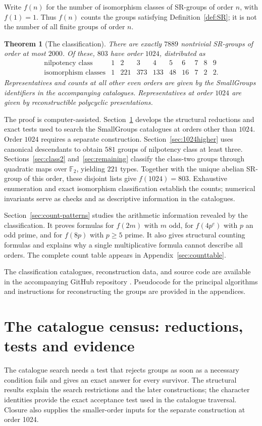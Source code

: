\documentclass[11pt,a4paper]{amsart}
\newtheorem{thm}{Theorem}[section]
\theoremstyle{definition}
\theoremstyle{remark}
\numberwithin{equation}{section}
\begin{document}
Write $f(n)$ for the number of isomorphism classes of SR-groups of
order $n$, with $f(1)=1$. Thus $f(n)$ counts the groups satisfying
Definition~\ref{def:SR}; it is not the number of all finite groups
of order $n$.
\begin{thm}[The classification]\label{thm:main-classification}
There are exactly $7889$ nontrivial SR-groups of order at most $2000$.
Of these, $803$ have order $1024$, distributed as
\[
\begin{array}{c|rrrrrrrrr}
\text{nilpotency class}&1&2&3&4&5&6&7&8&9\\\hline
\text{isomorphism classes}&1&221&373&133&48&16&7&2&2.
\end{array}
\]
Representatives and counts at all other even orders are given by the
SmallGroups identifiers in the accompanying catalogues. Representatives
at order $1024$ are given by reconstructible polycyclic presentations.
\end{thm}
The proof is computer-assisted. Section~\ref{sec:census} develops the
structural reductions and exact tests used to search the SmallGroups
catalogues at orders other than $1024$. Order $1024$ requires a separate
construction. Section~\ref{sec:1024higher} uses canonical descendants
to obtain $581$ groups of nilpotency class at least three.
Sections~\ref{sec:class2} and~\ref{sec:remaining} classify the class-two
groups through quadratic maps over $\mathbb F_2$, yielding $221$ types.
Together with the unique abelian SR-group of this order, these disjoint
lists give $f(1024)=803$. Exhaustive enumeration and exact isomorphism
classification establish the counts; numerical invariants serve as
checks and as descriptive information in the catalogues.

Section~\ref{sec:count-patterns} studies the arithmetic information
revealed by the classification. It proves formulas for $f(2m)$ with
$m$ odd, for $f(4p^e)$ with $p$ an odd prime, and for $f(8p)$ with
$p\ge5$ prime. It also gives structural counting formulas and explains
why a single multiplicative formula cannot describe all orders.
The complete count table appears in Appendix~\ref{sec:counttable}.

The classification catalogues, reconstruction data, and source code
are available in the accompanying GitHub repository \cite{github_luan26}.%
Pseudocode for the principal algorithms and instructions for reconstructing the
groups are provided in the appendices.


\section{The catalogue census: reductions, tests and evidence}
\label{sec:census}\label{sec:tools}
The catalogue search needs a test that rejects groups as soon as a
necessary condition fails and gives an exact answer for every survivor.
The structural results explain the search restrictions and the later
constructions; the character identities provide the exact acceptance
test used in the catalogue traversal. Closure also supplies the smaller-order
inputs for the separate construction at order 1024.
\end{document}
